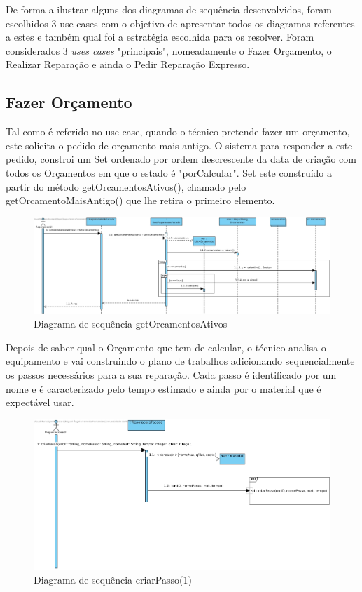 \documentclass[../relatorio.tex]{subfiles}
\begin{document}
De forma a ilustrar alguns dos diagramas de sequência desenvolvidos, foram escolhidos 3 use cases com o objetivo de 
apresentar todos os diagramas referentes a estes e também qual foi a estratégia escolhida para os resolver.
Foram considerados 3 \textit{uses cases} "principais", nomeadamente o Fazer Orçamento, o Realizar Reparação e ainda o
Pedir Reparação Expresso.

\subsection{Fazer Orçamento}
Tal como é referido no use case, quando o técnico pretende fazer um orçamento, este solicita o pedido de orçamento mais 
antigo. O sistema para responder a este pedido, constroi um Set ordenado por ordem descrescente da data de criação com todos os Orçamentos 
em que o estado é "porCalcular". Set este construído a partir do método getOrcamentosAtivos(), chamado pelo getOrcamentoMaisAntigo() que lhe retira
o primeiro elemento.
\begin{figure}[!ht]
    \centering
    \includegraphics[scale=0.45]{../assets/diagramas_sequencia/sd-GetOrcamentosAtivos.jpg}
    \caption{Diagrama de sequência getOrcamentosAtivos}
\end{figure}

Depois de saber qual o Orçamento que tem de calcular, o técnico analisa o equipamento e vai construindo o plano de trabalhos adicionando 
sequencialmente os passos necessários para a sua reparação. Cada passo é identificado por um nome e é caracterizado pelo tempo estimado e ainda
por o material que é expectável usar.

\begin{figure}[!ht]
    \centering
    \includegraphics[scale=0.45]{../assets/diagramas_sequencia/sd-criarPasso1.jpg}
    \caption{Diagrama de sequência criarPasso(1)}
\end{figure}
\end{document}
